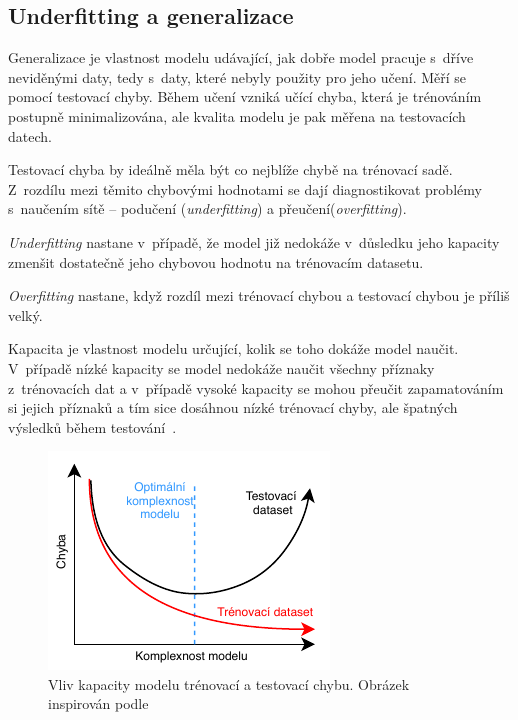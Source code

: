 

\subsection{Underfitting a generalizace}
Generalizace je vlastnost modelu udávající, jak dobře model pracuje s~dříve neviděnými daty, tedy s~daty, které nebyly použity pro jeho učení. Měří se pomocí testovací chyby. Během učení vzniká učící chyba, která je trénováním postupně minimalizována, ale kvalita modelu je pak měřena na testovacích datech. 

Testovací chyba by ideálně měla být co nejblíže chybě na trénovací sadě. Z~rozdílu mezi těmito chybovými hodnotami se dají diagnostikovat problémy s~naučením sítě -- podučení (\textit{underfitting}) a přeučení(\textit{overfitting}).

\textit{Underfitting} nastane v~případě, že model již nedokáže v~důsledku jeho kapacity zmenšit dostatečně jeho chybovou hodnotu na trénovacím datasetu.

\textit{Overfitting} nastane, když rozdíl mezi trénovací chybou a testovací chybou je příliš velký.

Kapacita je vlastnost modelu určující, kolik se toho dokáže model naučit. V~případě nízké kapacity se model nedokáže naučit všechny příznaky z~trénovacích dat a v~případě vysoké kapacity se mohou přeučit zapamatováním si jejich příznaků a tím sice dosáhnou nízké trénovací chyby, ale špatných výsledků během testování~\cite{mitdeeplearning}.
\begin{figure}[H]
    \centering
    \includegraphics[scale=1.35]{obrazky-figures/capacity_vs_error.pdf}
    \caption{\label{fig:gradientdescent}Vliv kapacity modelu trénovací a testovací chybu. Obrázek inspirován podle~\cite{trainingvstesterror}}
\end{figure}

